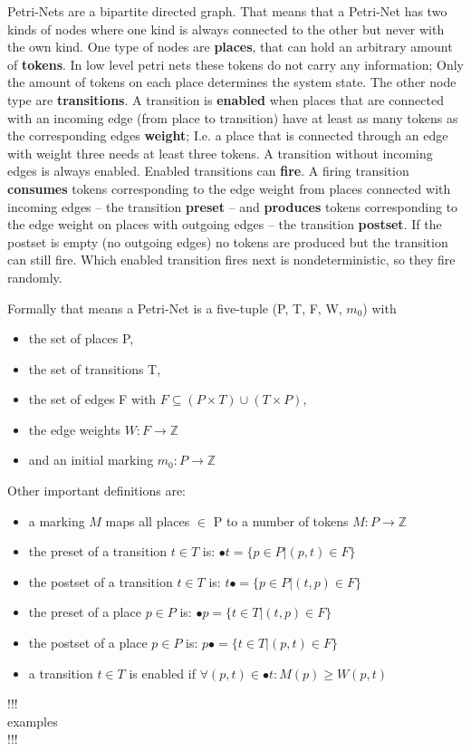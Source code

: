 Petri-Nets are a bipartite directed graph.
That means that a Petri-Net has two kinds of nodes where one kind is always connected to the other but never with the own kind.
One type of nodes are \textbf{places}, that can hold an arbitrary amount of \textbf{tokens}.
In low level petri nets these tokens do not carry any information; 
Only the amount of tokens on each place determines the system state.
The other node type are \textbf{transitions}.
A transition is \textbf{enabled} when places that are connected with an incoming edge (from place to transition) have at least as many tokens as the corresponding edges \textbf{weight};
I.e. a place that is connected through an edge with weight three needs at least three tokens.
A transition without incoming edges is always enabled.
Enabled transitions can \textbf{fire}.
A firing transition \textbf{consumes} tokens corresponding to the edge weight from places connected with incoming edges -- the transition \textbf{preset} -- and \textbf{produces} tokens corresponding to the edge weight on places with outgoing edges -- the transition \textbf{postset}.
If the postset is empty (no outgoing edges) no tokens are produced but the transition can still fire.
Which enabled transition fires next is nondeterministic, so they fire randomly.

Formally that means a Petri-Net is a five-tuple (P, T, F, W, $m_0$) with
\begin{itemize}
  \setlength\itemsep{-0.3em}
  \item the set of places P,
  \item the set of transitions T,
  \item the set of edges F with $F \subseteq (P \times T) \cup (T \times P)$,
  \item the edge weights $W: F \rightarrow \mathbb{Z} $
  \item and an initial marking $m_0: P \rightarrow \mathbb{Z} $
\end{itemize}
Other important definitions are:
\begin{itemize}
  \setlength\itemsep{-0.3em}
  \item a marking $M$ maps all places $\in$ P to a number of tokens $M: P \rightarrow \mathbb{Z}$
  \item the preset of a transition $t \in T$ is: $\bullet t = \{p \in P | (p,t) \in F\}$
  \item the postset of a transition $t \in T$ is: $t\bullet = \{p \in P | (t,p) \in F\}$
  \item the preset of a place $p \in P$ is: $\bullet p = \{t \in T | (t,p) \in F\}$
  \item the postset of a place $p \in P$ is: $p\bullet = \{t \in T | (p,t) \in F\}$
  \item a transition $t \in T$ is enabled if $\forall (p,t) \in \bullet t: M(p) \geq W(p,t)$
\end{itemize}
!!!\\
examples\\
!!!

